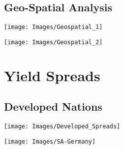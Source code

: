 \documentclass[11pt,preprint, authoryear]{elsarticle}
\let\origfigure\figure
\let\endorigfigure\endfigure
\renewenvironment{figure}[1][2] {
    \expandafter\origfigure\expandafter[H]
} {
    \endorigfigure
}
\numberwithin{equation}{section}
\numberwithin{figure}{section}
\numberwithin{table}{section}
\begin{document}
\hypertarget{geo-spatial-analysis}{%
\subsection{Geo-Spatial Analysis}\label{geo-spatial-analysis}}

\begin{figure}

{\centering \texttt{[image: Images/Geospatial\_1]} 

}

\caption{Average Bond Yield and Inflation \label{Figure3.1}}\label{fig:unnamed-chunk-7}
\end{figure}

\begin{figure}

{\centering \texttt{[image: Images/Geospatial\_2]} 

}

\caption{Average GDP Growth \label{Figure3.2}}\label{fig:unnamed-chunk-8}
\end{figure}

\hypertarget{yield-spreads}{%
\section{Yield Spreads}\label{yield-spreads}}

\hypertarget{developed-nations}{%
\subsection{Developed Nations}\label{developed-nations}}

\begin{figure}

{\centering \texttt{[image: Images/Developed\_Spreads]} 

}

\caption{Developed World Bond Yield Spreads \label{Figure4.1}}\label{fig:unnamed-chunk-9}
\end{figure}

\begin{figure}

{\centering \texttt{[image: Images/SA-Germany]} 

}

\caption{South Africa vs Germany Yield Spread \label{Figure4.2}}\label{fig:unnamed-chunk-10}
\end{figure}
\end{document}
